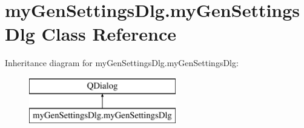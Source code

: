 \hypertarget{classmyGenSettingsDlg_1_1myGenSettingsDlg}{\section{my\-Gen\-Settings\-Dlg.\-my\-Gen\-Settings\-Dlg Class Reference}
\label{classmyGenSettingsDlg_1_1myGenSettingsDlg}
}
Inheritance diagram for my\-Gen\-Settings\-Dlg.\-my\-Gen\-Settings\-Dlg\-:\begin{figure}[H]
\begin{center}
\leavevmode
\includegraphics[height=2.000000cm]{classmyGenSettingsDlg_1_1myGenSettingsDlg}
\end{center}
\end{figure}
